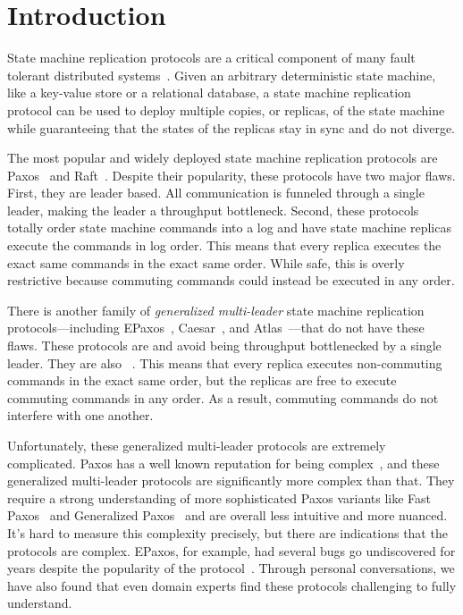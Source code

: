 \section{Introduction}
State machine replication protocols are a critical component of many fault
tolerant distributed systems~\cite{burrows2006chubby, corbett2013spanner,
thomson2012calvin, baker2011megastore, taft2020cockroachdb}. Given an arbitrary
deterministic state machine, like a key-value store or a relational database, a
state machine replication protocol can be used to deploy multiple copies, or
replicas, of the state machine while guaranteeing that the states of the
replicas stay in sync and do not diverge.

The most popular and widely deployed state machine replication protocols are
Paxos~\cite{lamport1998part, burrows2006chubby, corbett2013spanner} and
Raft~\cite{ongaro2014search, taft2020cockroachdb, tidb2019website,
yugabyte2019website}. Despite their popularity, these protocols have two major
flaws. First, they are leader based. All communication is funneled through a
single leader, making the leader a throughput bottleneck. Second, these
protocols totally order state machine commands into a log and have state
machine replicas execute the commands in log order. This means that every
replica executes the exact same commands in the exact same order. While safe,
this is overly restrictive because commuting commands could instead be executed
in any order.

There is another family of \emph{generalized multi-leader} state machine
replication protocols---including EPaxos~\cite{moraru2013there},
Caesar~\cite{arun2017speeding}, and Atlas~\cite{enes2020state}---that do not
have these flaws. These protocols are  and avoid being
throughput bottlenecked by a single leader. They are also
~\cite{lamport2005generalized, losa2016brief}. This means
that every replica executes non-commuting commands in the exact same order, but
the replicas are free to execute commuting commands in any order. As a result,
commuting commands do not interfere with one another.

Unfortunately, these generalized multi-leader protocols are extremely
complicated. Paxos has a well known reputation for being
complex~\cite{lamport2001paxos, van2015paxos, ongaro2014search}, and these
generalized multi-leader protocols are significantly more complex than that.
They require a strong understanding of more sophisticated Paxos variants like
Fast Paxos~\cite{lamport2006fast} and Generalized
Paxos~\cite{lamport2005generalized} and are overall less intuitive and more
nuanced. It's hard to measure this complexity precisely, but there are
indications that the protocols are complex. EPaxos, for example, had several
bugs go undiscovered for years despite the popularity of the
protocol~\cite{sutra2011fast}. Through personal conversations, we have also
found that even domain experts find these protocols challenging to fully
understand.

